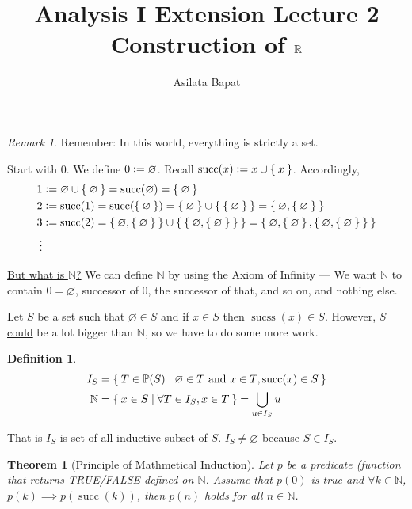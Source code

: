 \documentclass[12pt]{amsart}
\title{Analysis I Extension Lecture 2\\Construction of $\mathbb{R}$}
\author{Asilata Bapat}
\newcommand{\bbN}{\mathbb{N}}
\theoremstyle{plain}
\newtheorem*{thm}{Theorem}
\theoremstyle{remark}
\newtheorem*{rmk}{Remark}
\theoremstyle{definition}
\newtheorem*{define}{Definition}
\begin{document}
\maketitle
{}

\begin{rmk}
	Remember: In this world, everything is strictly a set.
\end{rmk}

Start with $0$. We define $0 \vcentcolon = \varnothing$.
Recall $\operatorname{succ}(x) \vcentcolon = x \cup \Set{x}$. 
Accordingly,
\begin{align*}
	1 &\vcentcolon = \varnothing \cup \Set{\varnothing} = \operatorname{succ}(\varnothing) = \Set{\varnothing}\\
	2 &\vcentcolon = \operatorname{succ}(1) = \operatorname{succ}(\Set{\varnothing}) = \Set{\varnothing} \cup \Set{\Set{\varnothing}} = \Set{\varnothing, \Set{\varnothing}}\\
	3 &\vcentcolon = \operatorname{succ}(2) = \Set{\varnothing, \Set{\varnothing}} \cup \Set{\Set{\varnothing, \Set{\varnothing}}} = \Set{\varnothing, \Set{\varnothing}, \Set{\varnothing, \Set{\varnothing}}}\\
	\vdots
\end{align*}

\ul{But what is $\bbN$?} We can define $\bbN$ by using the Axiom of Infinity --- We want $\bbN$ to contain $0 = \varnothing$, successor of $0$, the successor of that, and so on, and nothing else. 
\newline

Let $S$ be a set such that $\varnothing \in S$ and if $x \in S$ then $\operatorname{sucss}(x) \in S$. However, $S$ \ul{could} be a lot bigger than $\bbN$, so we have to do some more work. 

\begin{define}
	\begin{align*}
		I_S &= \Set{T \in \mathbb{P}(S)| \varnothing \in T \mbox{ and } x \in T,\operatorname{succ}(x) \in S}\\
		\bbN &= \Set{x \in S | \forall T \in I_S, x \in T} =  \bigcup\limits_{u \in I_S} u
	\end{align*}
\end{define}
That is $I_S$ is set of all inductive subset of $S$. $I_S \neq \varnothing$ because $S \in I_S$.

\begin{thm}[Principle of Mathmetical Induction]
	Let $p$ be a predicate (function that returns TRUE/FALSE defined on $\bbN$.
		Assume that $p(0)$ is true and $\forall k \in \bbN$, $p(k) \implies p(\operatorname{succ}(k))$, then $p(n)$ holds for all $n \in \bbN$.
\end{thm}
\end{document}
